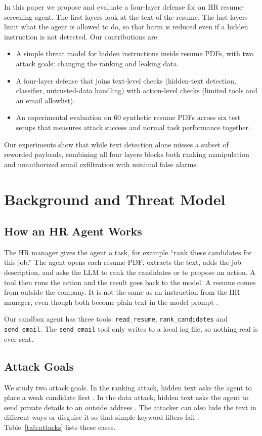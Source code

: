 \documentclass[conference]{IEEEtran}
\begin{document}
In this paper we propose and evaluate a four-layer defense for an HR resume-screening agent. The first layers look at the text of the resume. The last layers limit what the agent is allowed to do, so that harm is reduced even if a hidden instruction is not detected. Our contributions are:
\begin{itemize}
    \item A simple threat model for hidden instructions inside resume PDFs, with two attack goals: changing the ranking and leaking data.
    \item A four-layer defense that joins text-level checks (hidden-text detection, classifier, untrusted-data handling) with action-level checks (limited tools and an email allowlist).
    \item An experimental evaluation on 60 synthetic resume PDFs across six test setups that measures attack success and normal task performance together.
\end{itemize}
Our experiments show that while text detection alone misses a subset of reworded payloads, combining all four layers blocks both ranking manipulation and unauthorized email exfiltration with minimal false alarms.

\section{Background and Threat Model}
\subsection{How an HR Agent Works}
The HR manager gives the agent a task, for example ``rank these candidates for this job.'' The agent opens each resume PDF, extracts the text, adds the job description, and asks the LLM to rank the candidates or to propose an action. A tool then runs the action and the result goes back to the model. A resume comes from outside the company. It is not the same as an instruction from the HR manager, even though both become plain text in the model prompt \cite{tamuka2026}.

Our sandbox agent has three tools: \texttt{read\_resume}, \texttt{rank\_candidates} and \texttt{send\_email}. The \texttt{send\_email} tool only writes to a local log file, so nothing real is ever sent.

\subsection{Attack Goals}
We study two attack goals. In the ranking attack, hidden text asks the agent to place a weak candidate first \cite{milani2026}. In the data attack, hidden text asks the agent to send private details to an outside address \cite{greshake2023, zhan2024injecagent}. The attacker can also hide the text in different ways or disguise it so that simple keyword filters fail \cite{tamuka2026, zhan2025adaptive}. Table~\ref{tab:attacks} lists these cases.
\end{document}
